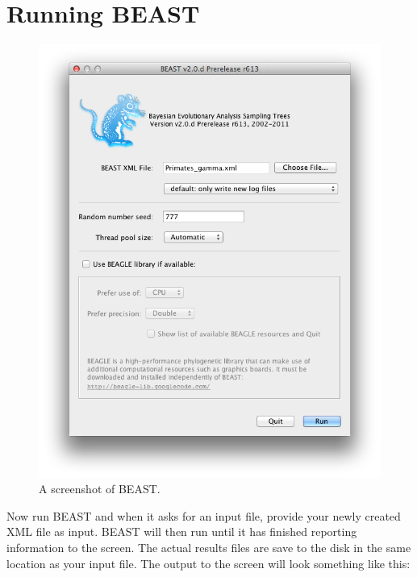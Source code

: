 \documentclass[11pt]{article}
\theoremstyle{plain}%
\theoremstyle{definition}
\theoremstyle{remark}
\begin{document}
\section{Running BEAST }

\begin{figure}
\includegraphics[width=\textwidth]{figures/BEAST}
\caption{A screenshot of BEAST.}
\label{fig:BEAST}
\end{figure}

Now run BEAST and when it asks for an input file, provide your newly
created XML file as input. BEAST will then run until it has finished
reporting information to the screen. The actual results files are
save to the disk in the same location as your input file. The output to the screen will
look something like this: 
\end{document}
